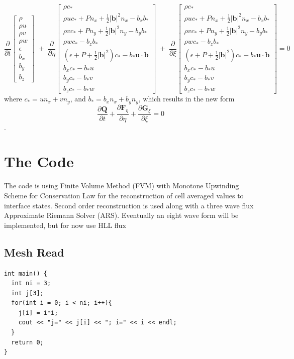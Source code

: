 \documentclass[paper=a4, fontsize=11pt]{scrartcl}
\newcommand{\pfrac}[2]{\frac{\partial#1}{\partial#2}}
\numberwithin{equation}{section}                %
\numberwithin{figure}{section}                  %
\numberwithin{table}{section}                           %
\begin{document}
\[
  \pfrac{}{t}
  \begin{bmatrix}
    \rho  \\
    \rho u  \\
    \rho v \\
    \rho w \\
    \epsilon\\
    b_x \\
    b_y \\
    b_z 
  \end{bmatrix}
  \;+\;\pfrac{}{\eta}
  \begin{bmatrix}
    \rho c_*  \\
    \rho u c_* + P n_x + \frac{1}{2}|\mathbf{b}|^2 n_x- b_x b_*\\
    \rho v c_* + P n_y + \frac{1}{2}|\mathbf{b}|^2 n_y - b_y b_* \\
    \rho w c_* - b_z b_*\\
    \left(\epsilon+ P + \frac{1}{2}|\mathbf{b}|^2 \right) c_* - b_* \mathbf{u}\cdot\mathbf{b}\\
    b_x c_* - b_* u\\
    b_y c_* - b_* v \\
    b_z c_* - b_* w 
  \end{bmatrix}
  \;+\;\pfrac{}{\xi}
  \begin{bmatrix}
    \rho c_*  \\
    \rho u c_* + P n_x + \frac{1}{2}|\mathbf{b}|^2 n_x - b_x b_* \\
    \rho v c_* + P n_y + \frac{1}{2}|\mathbf{b}|^2 n_y - b_y b_* \\
    \rho w c_* - b_z b_* \\
    \left(\epsilon+ P + \frac{1}{2}|\mathbf{b}|^2  \right) c_* - b_*\mathbf{u}\cdot\mathbf{b}\\
    b_x c_* - b_* u \\
    b_y c_* - b_* v \\
    b_z c_* - b_* w 
  \end{bmatrix}
  =0
\]
where $c_* = u n_x + v n_y$, and $b_* = b_x n_x + b_y n_y $, which results in the new form
\begin{equation} \label{eqn:mhdvecfluxarb}
  \pfrac{\mathbf{Q}}{t} + \pfrac{\mathbf{F}_\eta}{\eta} + \pfrac{\mathbf{G}_\xi}{\xi} = 0
\end{equation}.

\section{The Code}
The code is using Finite Volume Method (FVM) with Monotone Upwinding Scheme for Conservation Law for the reconstruction of cell averaged values to interface states. Second order reconstruction is used along with a three wave flux Approximate Riemann Solver (ARS). Eventually an eight wave form will be implemented, but for now use HLL flux \cite{harten1983}

\subsection{Mesh Read}


\begin{verbatim}
int main() {
  int ni = 3;
  int j[3];
  for(int i = 0; i < ni; i++){ 
    j[i] = i*i;
    cout << "j=" << j[i] << "; i=" << i << endl;
  }
  return 0;
}
\end{verbatim}

 
  
\end{document}
